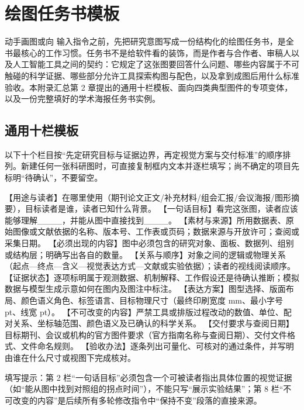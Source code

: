 \chapter{绘图任务书模板}
\label{app:brief-templates}

动手画图或向 \scidraw{} 输入指令之前，先把研究意图写成一份结构化的绘图任务书，是全书最核心的工作习惯。任务书不是给软件看的装饰，而是作者与合作者、审稿人以及人工智能工具之间的契约：它规定了这张图要回答什么问题、哪些内容属于不可触碰的科学证据、哪些部分允许工具探索构图与配色，以及拿到成图后用什么标准验收。本附录汇总第 2 章提出的通用十栏模板、面向四类典型图件的专项变体，以及一份完整填好的学术海报任务书实例。

\section{通用十栏模板}

以下十个栏目按“先定研究目标与证据边界，再定视觉方案与交付标准”的顺序排列。新建任何一张科研图时，可直接复制框内文本并逐栏填写；尚不确定的项目先标明“待确认”，不要留空。

\begin{Prompt}
【用途与读者】在哪里使用（期刊论文正文/补充材料/组会汇报/会议海报/图形摘要），目标读者是谁，读者已知什么背景。
【一句话目标】看完这张图，读者应该能够理解____，并能从图中直接找到____。
【素材与来源】所用数据表、原始图像或文献依据的名称、版本号、工作表或页码；数据来源与开放许可；查阅或采集日期。
【必须出现的内容】图中必须包含的研究对象、面板、数据列、组别或结构层；明确写出各自的数量。
【关系与顺序】对象之间的逻辑或物理关系（起点—终点—含义—视觉表达方式—文献或实验依据）；读者的视线阅读顺序。
【证据状态】逐项标明属于观测数据、机制解释、工作假设还是待确认推断；模拟数据与模型生成示意如何在图内及图注中标注。
【表达方案】图型选择、版面布局、颜色语义角色、标签语言、目标物理尺寸（最终印刷宽度 mm、最小字号 pt、线宽 pt）。
【不可改变的内容】严禁工具或排版过程改动的数值、单位、配对关系、坐标轴范围、颜色语义及已确认的科学关系。
【交付要求与查阅日期】目标期刊、会议或机构的官方图件要求（官方指南名称与查阅日期）、交付文件格式、文件命名规则。
【验收办法】逐条列出可量化、可核对的通过条件，并写明由谁在什么尺寸或视图下完成核对。
\end{Prompt}

\begin{BookNote}
填写提示：第 2 栏“一句话目标”必须包含一个可被读者指出具体位置的视觉证据（如“能从图中找到对照组的拐点时间”），不能只写“展示实验结果”；第 8 栏“不可改变的内容”是后续所有多轮修改指令中“保持不变”段落的直接来源。
\end{BookNote}

